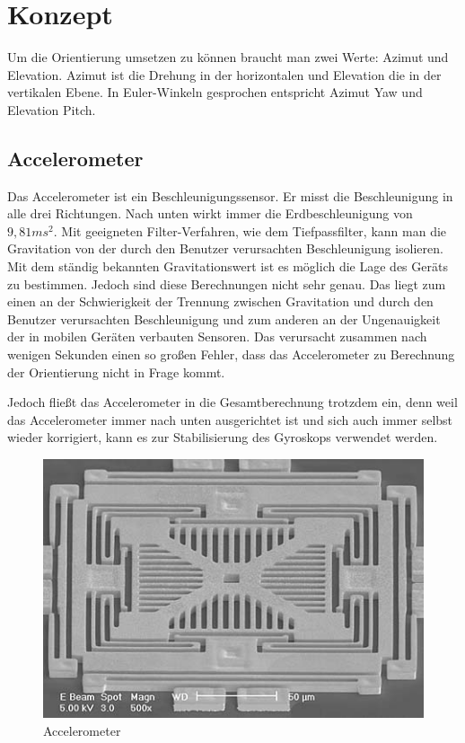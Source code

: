 
\chapter{Konzept}
  \label{Konzept}
  
Um die Orientierung umsetzen zu können braucht man zwei Werte: Azimut und Elevation. Azimut ist die Drehung in der horizontalen und Elevation die in der vertikalen Ebene. In Euler-Winkeln gesprochen entspricht Azimut Yaw und Elevation Pitch.

\section{Accelerometer}
Das Accelerometer ist ein Beschleunigungssensor. Er misst die Beschleunigung in alle drei Richtungen. Nach unten wirkt immer die Erdbeschleunigung von $9,81ms^2$. Mit geeigneten Filter-Verfahren, wie dem Tiefpassfilter, kann man die Gravitation von der durch den Benutzer verursachten Beschleunigung isolieren. Mit dem ständig bekannten Gravitationswert ist es möglich die Lage des Geräts zu bestimmen. Jedoch sind diese Berechnungen nicht sehr genau. Das liegt zum einen an der Schwierigkeit der Trennung zwischen Gravitation und durch den Benutzer verursachten Beschleunigung und zum anderen an der Ungenauigkeit der in mobilen Geräten verbauten Sensoren. Das verursacht zusammen nach wenigen Sekunden einen so großen Fehler, dass das Accelerometer zu Berechnung der Orientierung nicht in Frage kommt.

Jedoch fließt das Accelerometer in die Gesamtberechnung trotzdem ein, denn weil das Accelerometer immer nach unten ausgerichtet ist und sich auch immer selbst wieder korrigiert, kann es zur Stabilisierung des Gyroskops verwendet werden.

\begin{figure}[htb]
\centering
\includegraphics[scale=0.9]{figures/accelerometer}
\caption{Accelerometer \cite{sensorsmag} }
\label{fig:accelerometer}
\end{figure}

